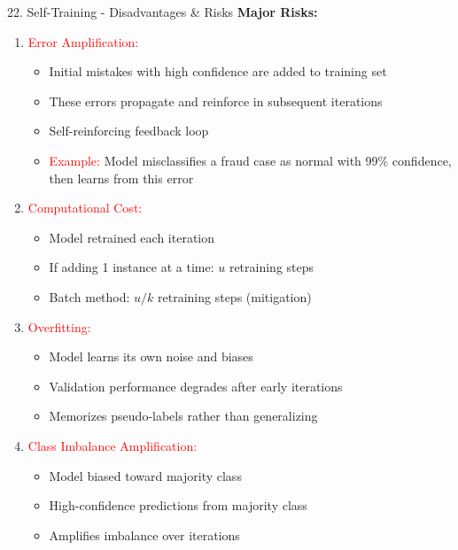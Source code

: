 \documentclass[8pt]{beamer}
\begin{document}
	\begin{frame}{22. Self-Training - Disadvantages \& Risks}
		\fontsize{6.5}{7.5}\selectfont
		\textbf{Major Risks:}
		
		\begin{enumerate}
			\item \textcolor{red}{Error Amplification:}
			\begin{itemize}
				\item Initial mistakes with high confidence are added to training set
				\item These errors propagate and reinforce in subsequent iterations
				\item Self-reinforcing feedback loop
				\item \textcolor{red}{Example:} Model misclassifies a fraud case as normal with 99\% confidence, then learns from this error
			\end{itemize}
			
			\item \textcolor{red}{Computational Cost:}
			\begin{itemize}
				\item Model retrained each iteration
				\item If adding 1 instance at a time: $u$ retraining steps
				\item Batch method: $u/k$ retraining steps (mitigation)
			\end{itemize}
			
			\item \textcolor{red}{Overfitting:}
			\begin{itemize}
				\item Model learns its own noise and biases
				\item Validation performance degrades after early iterations
				\item Memorizes pseudo-labels rather than generalizing
			\end{itemize}
			
			\item \textcolor{red}{Class Imbalance Amplification:}
			\begin{itemize}
				\item Model biased toward majority class
				\item High-confidence predictions from majority class
				\item Amplifies imbalance over iterations
			\end{itemize}
		\end{enumerate}
	\end{frame}
	
\end{document}
